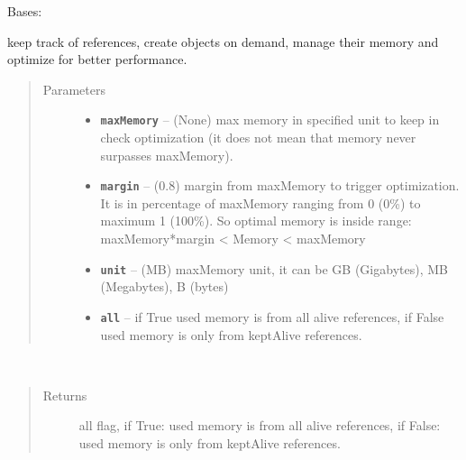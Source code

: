 \documentclass[letterpaper,10pt,english]{sphinxmanual}
\begin{document}

\begin{fulllineitems}
\label{RRtoolbox.lib:RRtoolbox.lib.cache.resourceManager}
Bases: {\hyperref[RRtoolbox.lib:RRtoolbox.lib.cache.retriever]{\emph{}}}

keep track of references, create objects on demand, manage their memory and optimize for better performance.
\begin{quote}\begin{description}
\item[{Parameters}] \leavevmode\begin{itemize}
\item {} 
\textbf{\texttt{maxMemory}} -- (None) max memory in specified unit to keep in check optimization (it does
not mean that memory never surpasses maxMemory).

\item {} 
\textbf{\texttt{margin}} -- (0.8) margin from maxMemory to trigger optimization.
It is in percentage of maxMemory ranging from 0 (0\%) to maximum 1 (100\%).
So optimal memory is inside range: maxMemory*margin \textless{} Memory \textless{} maxMemory

\item {} 
\textbf{\texttt{unit}} -- (MB) maxMemory unit, it can be GB (Gigabytes), MB (Megabytes), B (bytes)

\item {} 
\textbf{\texttt{all}} -- if True used memory is from all alive references,
if False used memory is only from keptAlive references.

\end{itemize}

\end{description}\end{quote}

\begin{fulllineitems}
\label{RRtoolbox.lib:RRtoolbox.lib.cache.resourceManager.all}~\begin{quote}\begin{description}
\item[{Returns}] \leavevmode
all flag, if True: used memory is from all alive references,
if False: used memory is only from keptAlive references.


\end{description}
\end{quote}
\end{fulllineitems}
\end{fulllineitems}
\end{document}

